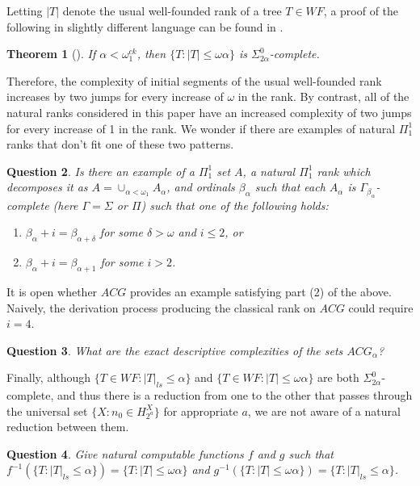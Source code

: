 \documentclass[12pt]{amsart}
\newtheorem{theorem}{Theorem}
\newtheorem{question}[theorem]{Question}
\begin{document}
Letting $|T|$ denote the usual well-founded rank of a tree $T\in WF$, a proof of the 
following in slightly different language can be found in \cite[Propositions 2.12 \& 2.15]
{GreenbergMontalbanSlaman2013}.
\begin{theorem}[\cite{GreenbergMontalbanSlaman2013}]
If $\alpha< \omega_1^{ck}$, then $\{T : |T| \leq \omega\alpha\}$ is 
$\Sigma^0_{2\alpha}$-complete.
\end{theorem}
Therefore, the complexity of initial segments of the usual well-founded rank increases 
by two jumps for every increase of $\omega$ in the rank.  
By contrast, all of 
the natural ranks considered in this paper have an increased complexity of two jumps for every 
increase of 1 in the rank.  We wonder if there are examples of natural $\Pi^1_1$ ranks that 
don't fit one of these two patterns.
\begin{question}
Is there an example of a $\Pi^1_1$ set $A$, 
a natural $\Pi^1_1$ rank which decomposes it as 
$A = \cup_{\alpha<\omega_1} A_\alpha$, 
and ordinals $\beta_\alpha$ such that
each $A_\alpha$ is $\Gamma_{\beta_\alpha}$-complete (here $\Gamma=\Sigma$ or $\Pi$)
such that one of the following holds:
\begin{enumerate}
\item $\beta_{\alpha} + i = \beta_{\alpha+\delta}$ for some $\delta > \omega$ and $i\leq 2$, or
\item $\beta_{\alpha} + i = \beta_{\alpha+1} $ for some $i >2$.
\end{enumerate}
\end{question}
It is open whether $ACG$ provides an example satisfying part (2) of the above. 
Naively, the derivation process producing the classical rank on $ACG$ could require 
$i=4$.
\begin{question}
What are the exact descriptive complexities of the sets $ACG_\alpha$?
\end{question}

Finally, although $\{T \in WF : |T|_{ls} \leq \alpha\}$ and 
$\{T \in WF : |T| \leq \omega\alpha\}$ are both $\Sigma^0_{2\alpha}$-complete,
and thus there is a reduction from one to the other that passes through 
the universal set $\{X : n_0 \in H_{2^a}^X\}$ for appropriate $a$, 
we are not aware of a natural reduction between them.

\begin{question}
Give natural computable functions $f$ and $g$ such that $f^{-1}(\{T : |T|_{ls} \leq \alpha\}) = \{T : |T| \leq \omega\alpha\}$ and $g^{-1}(\{T : |T|\leq \omega\alpha\}) = \{T : |T|_{ls} \leq \alpha\}$.
\end{question}




\end{document}
